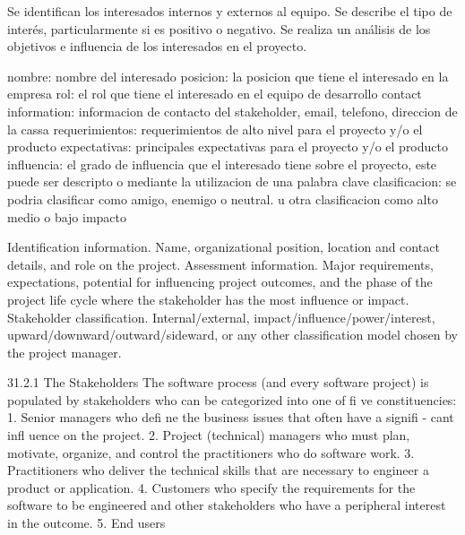 Se identifican los interesados internos y
externos al equipo. Se describe el tipo de
interés, particularmente si es positivo o
negativo. Se realiza un análisis de los objetivos
e influencia de los interesados en el proyecto.


nombre: nombre del interesado
posicion: la posicion que tiene el interesado en la empresa
rol: el rol que tiene el interesado en el equipo de desarrollo
contact information: informacion de contacto del stakeholder, email, telefono, direccion de la cassa
requerimientos: requerimientos de alto nivel para el proyecto y/o el producto
expectativas: principales expectativas para el proyecto y/o el producto
influencia: el grado de influencia que el interesado tiene sobre el proyecto, este puede ser descripto o mediante la utilizacion de una palabra clave
clasificacion: se podria clasificar como amigo, enemigo o neutral. u otra clasificacion como alto medio o bajo impacto


Identification information. Name, organizational position, location and
contact details, and role on the project.
Assessment information. Major requirements, expectations, potential for
influencing project outcomes, and the phase of the project life cycle where the
stakeholder has the most influence or impact.
Stakeholder classification. Internal/external, impact/influence/power/interest,
upward/downward/outward/sideward, or any other classification model chosen
by the project manager.

31.2.1 The Stakeholders
The software process (and every software project) is populated by stakeholders
who can be categorized into one of fi ve constituencies:
1. Senior managers who defi ne the business issues that often have a signifi -
cant infl uence on the project.
2. Project (technical) managers who must plan, motivate, organize, and control
the practitioners who do software work.
3. Practitioners who deliver the technical skills that are necessary to engineer
a product or application.
4. Customers who specify the requirements for the software to be engineered
and other stakeholders who have a peripheral interest in the
outcome.
5. End users

\newpage

\begin{table}[]
\end{table}